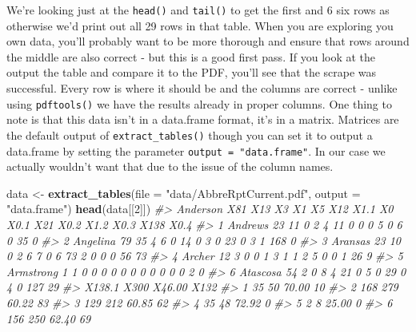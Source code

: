 \documentclass[
  12pt,
]{book}
\newenvironment{Shaded}{\begin{snugshade}}{\end{snugshade}}
\newcommand{\CommentTok}[1]{\textcolor[rgb]{0.37,0.37,0.37}{\textit{#1}}}
\newcommand{\DataTypeTok}[1]{\textcolor[rgb]{0.27,0.27,0.27}{#1}}
\newcommand{\DecValTok}[1]{\textcolor[rgb]{0.06,0.06,0.06}{#1}}
\newcommand{\KeywordTok}[1]{\textcolor[rgb]{0.27,0.27,0.27}{\textbf{#1}}}
\newcommand{\NormalTok}[1]{#1}
\newcommand{\StringTok}[1]{\textcolor[rgb]{0.5,0.5,0.5}{#1}}
\begin{document}
We're looking just at the \texttt{head()} and \texttt{tail()} to get the first and 6 six rows as otherwise we'd print out all 29 rows in that table. When you are exploring you own data, you'll probably want to be more thorough and ensure that rows around the middle are also correct - but this is a good first pass. If you look at the output the table and compare it to the PDF, you'll see that the scrape was successful. Every row is where it should be and the columns are correct - unlike using \texttt{pdftools()} we have the results already in proper columns. One thing to note is that this data isn't in a data.frame format, it's in a matrix. Matrices are the default output of \texttt{extract\_tables()} though you can set it to output a data.frame by setting the parameter \texttt{output\ =\ "data.frame"}. In our case we actually wouldn't want that due to the issue of the column names.

\begin{Shaded}
\begin{Highlighting}[]
\NormalTok{data \textless{}{-}}\StringTok{ }\KeywordTok{extract\_tables}\NormalTok{(}\DataTypeTok{file =} \StringTok{"data/AbbreRptCurrent.pdf"}\NormalTok{, }\DataTypeTok{output =} \StringTok{"data.frame"}\NormalTok{)}
\KeywordTok{head}\NormalTok{(data[[}\DecValTok{2}\NormalTok{]])}
\CommentTok{\#\textgreater{}    Anderson X81 X13 X3 X1 X5 X12 X1.1 X0 X0.1 X21 X0.2 X1.2 X0.3 X138 X0.4}
\CommentTok{\#\textgreater{} 1   Andrews  23  11  0  2  4  11    0  0    0   5    0    6    0   35    0}
\CommentTok{\#\textgreater{} 2  Angelina  79  35  4  6  0  14    0  3    0  23    0    3    1  168    0}
\CommentTok{\#\textgreater{} 3   Aransas  23  10  0  2  6   7    0  6   73   2    0    0    0   56   73}
\CommentTok{\#\textgreater{} 4    Archer  12   3  0  0  1   3    1  1    2   5    0    0    1   26    9}
\CommentTok{\#\textgreater{} 5 Armstrong   1   1  0  0  0   0    0  0    0   0    0    0    0    2    0}
\CommentTok{\#\textgreater{} 6  Atascosa  54   2  0  8  4  21    0  5    0  29    0    4    0  127   29}
\CommentTok{\#\textgreater{}   X138.1 X300 X46.00 X132}
\CommentTok{\#\textgreater{} 1     35   50  70.00   10}
\CommentTok{\#\textgreater{} 2    168  279  60.22   83}
\CommentTok{\#\textgreater{} 3    129  212  60.85   62}
\CommentTok{\#\textgreater{} 4     35   48  72.92    0}
\CommentTok{\#\textgreater{} 5      2    8  25.00    0}
\CommentTok{\#\textgreater{} 6    156  250  62.40   69}
\end{Highlighting}
\end{Shaded}
\end{document}
